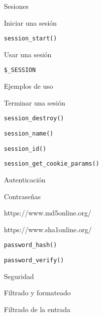 \begin{longenum}
\begin{longenum}
        \item Sesiones
        \begin{longenum}
            \item Iniciar una sesión
            \begin{longenum}
                \item \texttt{session\_start()}
            \end{longenum}
            \item Usar una sesión
            \begin{longenum}
                \item \texttt{\$\_SESSION}
                \item Ejemplos de uso
            \end{longenum}
            \item Terminar una sesión
            \begin{longenum}
                \item \texttt{session\_destroy()}
                \item \texttt{session\_name()}
                \item \texttt{session\_id()}
                \item \texttt{session\_get\_cookie\_params()}
            \end{longenum}
        \end{longenum}
        \item Autenticación
        \begin{longenum}
            \item Contraseñas
            \begin{longenum}
                \item https://www.md5online.org/
                \item https://www.sha1online.org/
                \item \texttt{password\_hash()}
                \item \texttt{password\_verify()}
            \end{longenum}
        \end{longenum}
        \item Seguridad
        \begin{longenum}
            \item Filtrado y formateado
            \begin{longenum}
                \item Filtrado de la entrada
                \begin{longenum}

\end{longenum}
\end{longenum}
\end{longenum}
\end{longenum}
\end{longenum}
